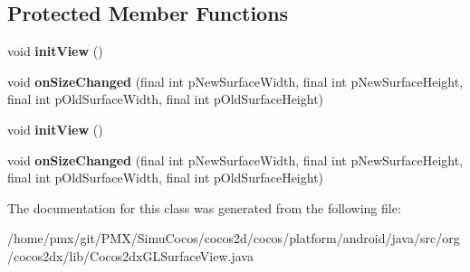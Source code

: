 \subsection*{Protected Member Functions}
\begin{DoxyCompactItemize}
\item 
\mbox{\label{classorg_1_1cocos2dx_1_1lib_1_1Cocos2dxGLSurfaceView_ab2c4abb00eb5a75f250b806374ea710e}} 
void {\bfseries init\+View} ()
\item 
\mbox{\label{classorg_1_1cocos2dx_1_1lib_1_1Cocos2dxGLSurfaceView_add4e2aa1e73fbe42ece1ab0d9e4359bb}} 
void {\bfseries on\+Size\+Changed} (final int p\+New\+Surface\+Width, final int p\+New\+Surface\+Height, final int p\+Old\+Surface\+Width, final int p\+Old\+Surface\+Height)
\item 
\mbox{\label{classorg_1_1cocos2dx_1_1lib_1_1Cocos2dxGLSurfaceView_ab2c4abb00eb5a75f250b806374ea710e}} 
void {\bfseries init\+View} ()
\item 
\mbox{\label{classorg_1_1cocos2dx_1_1lib_1_1Cocos2dxGLSurfaceView_add4e2aa1e73fbe42ece1ab0d9e4359bb}} 
void {\bfseries on\+Size\+Changed} (final int p\+New\+Surface\+Width, final int p\+New\+Surface\+Height, final int p\+Old\+Surface\+Width, final int p\+Old\+Surface\+Height)
\end{DoxyCompactItemize}


The documentation for this class was generated from the following file\+:\begin{DoxyCompactItemize}
\item 
/home/pmx/git/\+P\+M\+X/\+Simu\+Cocos/cocos2d/cocos/platform/android/java/src/org/cocos2dx/lib/Cocos2dx\+G\+L\+Surface\+View.\+java\end{DoxyCompactItemize}
